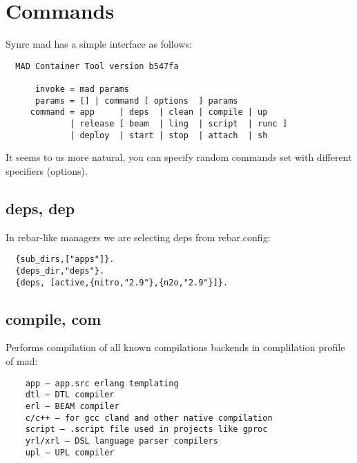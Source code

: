 \section{Commands}

Synrc mad has a simple interface as follows:

\vspace{1\baselineskip}
\begin{lstlisting}
  MAD Container Tool version b547fa

      invoke = mad params
      params = [] | command [ options  ] params
     command = app     | deps  | clean | compile | up
             | release [ beam  | ling  | script  | runc ]
             | deploy  | start | stop  | attach  | sh
\end{lstlisting}
\vspace{1\baselineskip}

It seems to us more natural, you can specify random
commands set with different specifiers (options).

\subsection{deps, dep}

In rebar-like managers we are selecting deps from rebar.config:
\vspace{1\baselineskip}
\begin{lstlisting}
  {sub_dirs,["apps"]}.
  {deps_dir,"deps"}.
  {deps, [active,{nitro,"2.9"},{n2o,"2.9"}]}.
\end{lstlisting}
\vspace{1\baselineskip}


\subsection{compile, com}
Performs compilation of all known compilations backends in complilation profile of mad:
\vspace{1\baselineskip}
\begin{lstlisting}
    app — app.src erlang templating
    dtl — DTL compiler
    erl — BEAM compiler
    c/c++ — for gcc cland and other native compilation
    script — .script file used in projects like gproc
    yrl/xrl — DSL language parser compilers
    upl — UPL compiler
\end{lstlisting}
\vspace{1\baselineskip}

